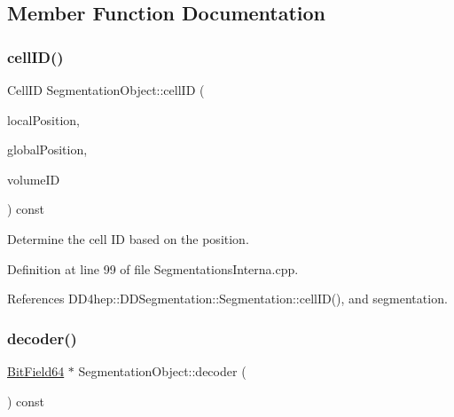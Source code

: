 \subsection{Member Function Documentation}
\hypertarget{class_d_d4hep_1_1_geometry_1_1_segmentation_object_a45ef8e9a429b44b45ec7a50cc0da3817}{}\label{class_d_d4hep_1_1_geometry_1_1_segmentation_object_a45ef8e9a429b44b45ec7a50cc0da3817} 
\subsubsection{\texorpdfstring{cell\+I\+D()}{cellID()}}
{\footnotesize\ttfamily Cell\+ID Segmentation\+Object\+::cell\+ID (\begin{DoxyParamCaption}\item[{const \hyperlink{namespace_d_d4hep_1_1_geometry_a55083902099d03506c6db01b80404900}{Position} \&}]{local\+Position,  }\item[{const \hyperlink{namespace_d_d4hep_1_1_geometry_a55083902099d03506c6db01b80404900}{Position} \&}]{global\+Position,  }\item[{const Volume\+ID \&}]{volume\+ID }\end{DoxyParamCaption}) const}



Determine the cell ID based on the position. 



Definition at line 99 of file Segmentations\+Interna.\+cpp.



References D\+D4hep\+::\+D\+D\+Segmentation\+::\+Segmentation\+::cell\+I\+D(), and segmentation.

\hypertarget{class_d_d4hep_1_1_geometry_1_1_segmentation_object_abc372258e19cc674c4836de96cc894e1}{}\label{class_d_d4hep_1_1_geometry_1_1_segmentation_object_abc372258e19cc674c4836de96cc894e1} 
\subsubsection{\texorpdfstring{decoder()}{decoder()}}
{\footnotesize\ttfamily \hyperlink{class_d_d4hep_1_1_d_d_segmentation_1_1_bit_field64}{Bit\+Field64} $\ast$ Segmentation\+Object\+::decoder (\begin{DoxyParamCaption}{ }\end{DoxyParamCaption}) const}



